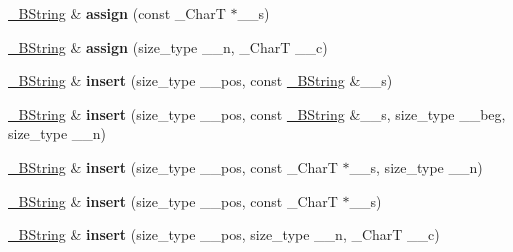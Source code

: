 \begin{DoxyCompactItemize}
\item 
\mbox{\label{class____bstr__sum_af24e1b51842ebebbfa4527af27c7e114}} 
\hyperlink{classbasic__string}{\+\_\+\+B\+String} \& {\bfseries assign} (const \+\_\+\+CharT $\ast$\+\_\+\+\_\+s)
\item 
\mbox{\label{class____bstr__sum_a7727b76f07646105bdd2b78226d99c2e}} 
\hyperlink{classbasic__string}{\+\_\+\+B\+String} \& {\bfseries assign} (size\+\_\+type \+\_\+\+\_\+n, \+\_\+\+CharT \+\_\+\+\_\+c)
\item 
\mbox{\label{class____bstr__sum_a5067ba4a7e38aef67f6b3668c37ecdf7}} 
\hyperlink{classbasic__string}{\+\_\+\+B\+String} \& {\bfseries insert} (size\+\_\+type \+\_\+\+\_\+pos, const \hyperlink{classbasic__string}{\+\_\+\+B\+String} \&\+\_\+\+\_\+s)
\item 
\mbox{\label{class____bstr__sum_a194b23a0c06ea0f640f0872c8bb37f6d}} 
\hyperlink{classbasic__string}{\+\_\+\+B\+String} \& {\bfseries insert} (size\+\_\+type \+\_\+\+\_\+pos, const \hyperlink{classbasic__string}{\+\_\+\+B\+String} \&\+\_\+\+\_\+s, size\+\_\+type \+\_\+\+\_\+beg, size\+\_\+type \+\_\+\+\_\+n)
\item 
\mbox{\label{class____bstr__sum_aa4e204efc7d6727c4c75775f7fb97a56}} 
\hyperlink{classbasic__string}{\+\_\+\+B\+String} \& {\bfseries insert} (size\+\_\+type \+\_\+\+\_\+pos, const \+\_\+\+CharT $\ast$\+\_\+\+\_\+s, size\+\_\+type \+\_\+\+\_\+n)
\item 
\mbox{\label{class____bstr__sum_acbcf9e0bb565b01bf7a6abb3e9dc50dc}} 
\hyperlink{classbasic__string}{\+\_\+\+B\+String} \& {\bfseries insert} (size\+\_\+type \+\_\+\+\_\+pos, const \+\_\+\+CharT $\ast$\+\_\+\+\_\+s)
\item 
\mbox{\label{class____bstr__sum_a10a27b7e0cc2d098c87425583b574998}} 
\hyperlink{classbasic__string}{\+\_\+\+B\+String} \& {\bfseries insert} (size\+\_\+type \+\_\+\+\_\+pos, size\+\_\+type \+\_\+\+\_\+n, \+\_\+\+CharT \+\_\+\+\_\+c)
\item 
\mbox{\label{class____bstr__sum_a170dada233536db3539fa1619dac7f25}} 

\end{DoxyCompactItemize}
